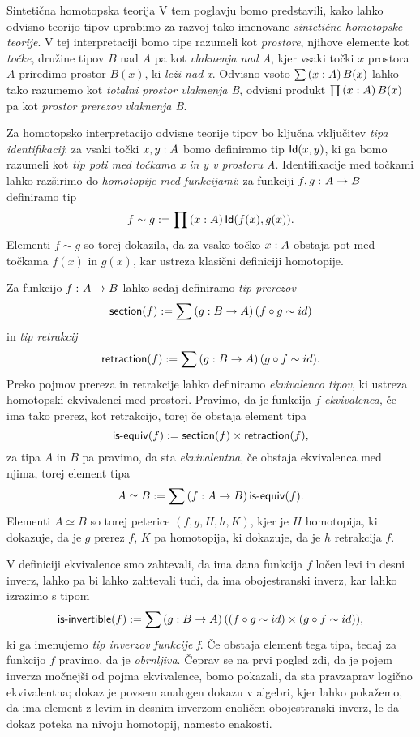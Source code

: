 \documentclass[a4paper, slovene]{article}
\begin{document}
\begin{section}{Sintetična homotopska teorija}
  V tem poglavju bomo predstavili, kako lahko odvisno teorijo tipov uprabimo za razvoj
  tako imenovane \emph{sintetične homotopske teorije}. V tej interpretaciji
  bomo tipe razumeli kot \emph{prostore}, njihove elemente kot \emph{točke}, družine
  tipov \(B\) nad \(A\) pa kot \emph{vlaknenja nad A}, kjer vsaki točki \(x\)
  prostora \(A\) priredimo prostor \(B(x)\), ki \emph{leži nad x}. Odvisno vsoto
  \(\sum \left( x : A \right) B(x)\) lahko tako razumemo kot \emph{totalni prostor vlaknenja B},
  odvisni produkt \(\prod \left( x : A \right) B(x)\) pa kot \emph{prostor prerezov vlaknenja B}.

  Za homotopsko interpretacijo
  odvisne teorije tipov bo ključna vključitev \emph{tipa identifikacij}: za vsaki točki
  \(x, y : A\) bomo definiramo tip \(\textnormal{\textsf{Id}}(x, y)\),
  ki ga bomo razumeli
  kot \emph{tip poti med točkama x in y v prostoru A}. Identifikacije med točkami
  lahko razširimo do \emph{homotopije med funkcijami}: za funkciji \(f, g \,\colon A \to B\)
  definiramo tip
  \[f \sim g := \prod \left( x : A \right) \textnormal{\textsf{Id}}(f(x), g(x)).\]
  Elementi \(f \sim g\) so torej dokazila, da za vsako točko \(x : A\) obstaja
  pot med točkama \(f(x)\) in \(g(x)\), kar ustreza klasični definiciji homotopije.

  Za funkcijo \(f \,\colon A \to B\) lahko sedaj definiramo \emph{tip prerezov}
  \[\textnormal{\textsf{section}}(f) := \sum \left( g : B \to A \right) (f \circ g \sim id)\] in \emph{tip retrakcij}
  \[\textnormal{\textsf{retraction}}(f) := \sum \left( g : B \to A \right) (g \circ f \sim id).\]
  Preko pojmov prereza in retrakcije lahko definiramo \emph{ekvivalenco tipov},
  ki ustreza homotopski ekvivalenci
  med prostori. Pravimo, da je funkcija \(f\) \emph{ekvivalenca}, če ima tako prerez, kot
  retrakcijo, torej če obstaja element tipa
  \[\textnormal{\textsf{is-equiv}}(f) := \textnormal{\textsf{section}}(f) \times \textnormal{\textsf{retraction}}(f),\] za tipa \(A\) in \(B\) pa pravimo, da sta
  \emph{ekvivalentna}, če obstaja ekvivalenca med njima, torej element tipa
  \[A \simeq B := \sum \left( f : A \to B \right) \textnormal{\textsf{is-equiv}}(f).\]
  Elementi \(A \simeq B\) so torej peterice \((f, g, H, h, K)\), kjer je \(H\) homotopija,
  ki dokazuje, da je \(g\) prerez \(f\), \(K\) pa homotopija, ki dokazuje, da je \(h\)
  retrakcija \(f\).

  V definiciji ekvivalence smo zahtevali, da ima dana funkcija \(f\)
  ločen levi in desni inverz, lahko pa bi lahko zahtevali tudi,
  da ima obojestranski inverz, kar lahko izrazimo s tipom
  \[\textnormal{\textsf{is-invertible}}(f) := \sum \left( g : B \to A \right) ((f \circ g \sim id) \times (g \circ f \sim id)),\]
  ki ga imenujemo \emph{tip inverzov funkcije f}. Če obstaja element tega tipa, tedaj
  za funkcijo \(f\)
  pravimo, da je \emph{obrnljiva}. Čeprav se na prvi pogled zdi,
  da je pojem inverza močnejši od pojma ekvivalence, bomo pokazali, da sta pravzaprav
  logično ekvivalentna; dokaz je povsem analogen dokazu v algebri, kjer lahko pokažemo,
  da ima element z levim in desnim inverzom enoličen obojestranski inverz, le da dokaz
  poteka na nivoju homotopij, namesto enakosti.


\end{section}
\end{document}
